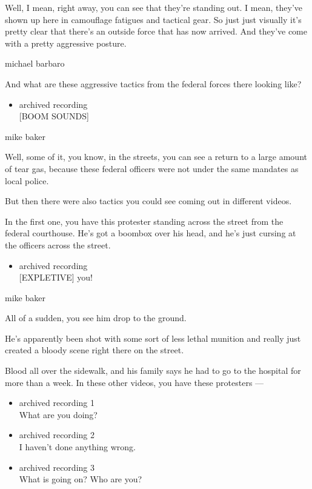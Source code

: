 Well, I mean, right away, you can see that they're standing out. I mean,
they've shown up here in camouflage fatigues and tactical gear. So just
just visually it's pretty clear that there's an outside force that has
now arrived. And they've come with a pretty aggressive posture.

michael barbaro

And what are these aggressive tactics from the federal forces there
looking like?

\begin{itemize}
\tightlist
\item
  archived recording\\
  {[}BOOM SOUNDS{]}
\end{itemize}

mike baker

Well, some of it, you know, in the streets, you can see a return to a
large amount of tear gas, because these federal officers were not under
the same mandates as local police.

But then there were also tactics you could see coming out in different
videos.

In the first one, you have this protester standing across the street
from the federal courthouse. He's got a boombox over his head, and he's
just cursing at the officers across the street.

\begin{itemize}
\tightlist
\item
  archived recording\\
  {[}EXPLETIVE{]} you!
\end{itemize}

mike baker

All of a sudden, you see him drop to the ground.

He's apparently been shot with some sort of less lethal munition and
really just created a bloody scene right there on the street.

Blood all over the sidewalk, and his family says he had to go to the
hospital for more than a week. In these other videos, you have these
protesters ---

\begin{itemize}
\item
  archived recording 1\\
  What are you doing?
\item
  archived recording 2\\
  I haven't done anything wrong.
\item
  archived recording 3\\
  What is going on? Who are you?
\end{itemize}

